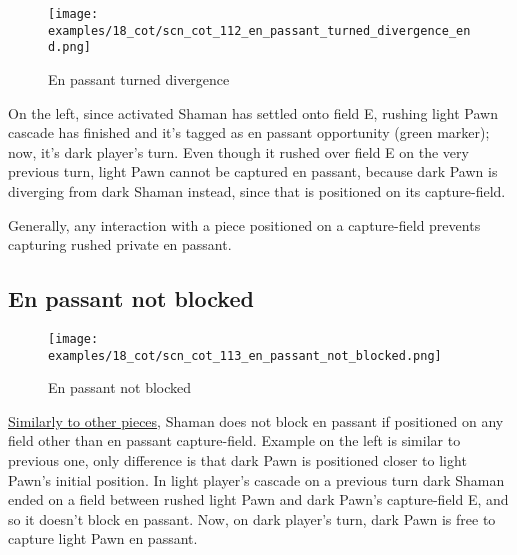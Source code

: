 \vspace*{-0.3\baselineskip}
\noindent
\begin{wrapfigure}[13]{l}{0.4\textwidth}
\centering
\texttt{[image: examples/18\_cot/scn\_cot\_112\_en\_passant\_turned\_divergence\_end.png]}
\vspace*{-0.5\baselineskip}
\caption{En passant turned divergence}
\label{fig:scn_cot_112_en_passant_turned_divergence_end}
\end{wrapfigure}
On the left, since activated Shaman has settled onto field E, rushing light Pawn
cascade has finished and it's tagged as en passant opportunity (green marker); now,
it's dark player's turn.\newline
\indent
Even though it rushed over field E on the very previous turn, light Pawn cannot
be captured en passant, because dark Pawn is diverging from dark Shaman instead,
since that is positioned on its capture-field.

Generally, any interaction with a piece positioned on a capture-field prevents
capturing rushed private en passant.

\clearpage %

\subsection*{En passant not blocked}
\label{sec:Conquest of Tlalocan/Rush, en passant/En passant not blocked}

\vspace*{-0.7\baselineskip}
\noindent
\begin{wrapfigure}[12]{l}{0.4\textwidth}
\centering
\texttt{[image: examples/18\_cot/scn\_cot\_113\_en\_passant\_not\_blocked.png]}
\vspace*{-0.5\baselineskip}
\caption{En passant not blocked}
\label{fig:scn_cot_113_en_passant_not_blocked}
\end{wrapfigure}
\hyperref[fig:scn_mv_092_en_passant_not_blocked_init]{Similarly to other pieces},
Shaman does not block en passant if positioned on any field other than en passant
capture-field.\newline
\indent
Example on the left is similar to previous one, only difference is that dark Pawn
is positioned closer to light Pawn's initial position. In light player's cascade
on a previous turn dark Shaman ended on a field between rushed light Pawn and
dark Pawn's capture-field E, and so it doesn't block en passant. Now, on dark
player's turn, dark Pawn is free to capture light Pawn en passant.

